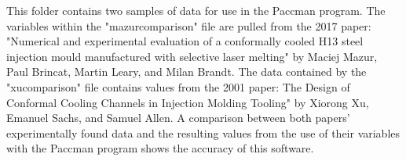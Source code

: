 \documentclass[a4paper,12pt]{article}
\begin{document}
\setlength{\parindent}{0em}
\doublespacing
\captionsetup{labelformat=empty}

This folder contains two samples of data for use in the Paccman program. The variables within the "mazurcomparison" file are pulled from the 2017 paper: "Numerical and experimental evaluation of a conformally cooled H13 steel injection mould manufactured with selective laser melting" by Maciej Mazur, Paul Brincat, Martin Leary, and Milan Brandt. The data contained by the "xucomparison" file contains values from the 2001 paper: The Design of Conformal Cooling Channels in Injection Molding Tooling" by Xiorong Xu, Emanuel Sachs, and Samuel Allen. A comparison between both papers' experimentally found data and the resulting values from the use of their variables with the Paccman program  shows the accuracy of this software.
\end{document}
